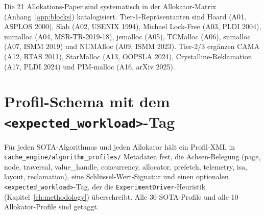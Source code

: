 Die 21 Allokations-Paper sind systematisch in der Allokator-Matrix (Anhang~\ref{app:blocks})
katalogisiert. Tier-1-Repräsentanten sind Hoard (A01, ASPLOS 2000), Slab (A02, USENIX 1994),
Michael Lock-Free (A03, PLDI 2004), mimalloc (A04, MSR-TR-2019-18), jemalloc (A05), TCMalloc
(A06), snmalloc (A07, ISMM 2019) und NUMAlloc (A09, ISMM 2023). Tier-2/3 ergänzen CAMA (A12,
RTAS 2011), StarMalloc (A13, OOPSLA 2024), Crystalline-Reklamation (A17, PLDI 2024) und
PIM-malloc (A16, arXiv 2025).

\section{Profil-Schema mit dem \texorpdfstring{\texttt{<expected\_workload>}}{expected\_workload}-Tag}\label{sec:profile-schema}

Für jeden SOTA-Algorithmus und jeden Allokator hält ein Profil-XML in
\texttt{cache\_engine/algorithm\_profiles/} Metadaten fest, die Achsen-Belegung (page, node,
traversal, value\_handle, concurrency, allocator, prefetch, telemetry, isa, layout,
reclamation), eine Schlüssel-Wert-Signatur und einen optionalen
\texttt{<expected\_workload>}-Tag, der die \texttt{ExperimentDriver}-Heuristik
(Kapitel~\ref{ch:methodology}) überschreibt. Alle 30 SOTA-Profile und alle 10
Allokator-Profile sind getaggt.

